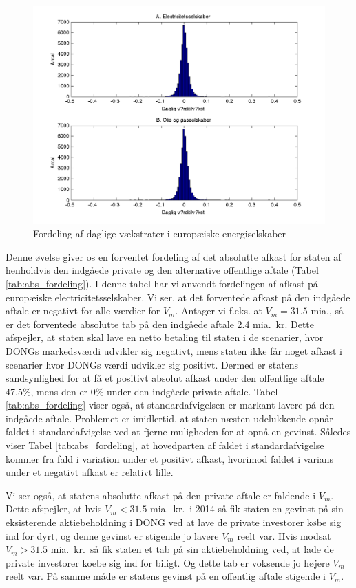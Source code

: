 \documentclass{article}
\begin{document}
\begin{figure}
\includegraphics[scale=0.8]{../matlab/figs/data_hist}
\caption{Fordeling af daglige v\ae{}kstrater i europ\ae{}iske energiselskaber}
\label{fig:data_hist}
\end{figure}

Denne øvelse giver os en forventet fordeling af det absolutte afkast for staten af henholdvis den indgåede private og den alternative offentlige aftale (Tabel \ref{tab:abs_fordeling}). I denne tabel har vi anvendt fordelingen af afkast på europæiske electricitetsselskaber. Vi ser, at det forventede afkast på den indgåede aftale er negativt for alle værdier for $V_m$. Antager vi f.eks. at $V_m=31.5$ mia., så er det forventede absolutte tab på den indgåede aftale 2.4 mia.\ kr. Dette afspejler, at staten skal lave en netto betaling til staten i de scenarier, hvor DONGs markedsværdi udvikler sig negativt, mens staten ikke får noget afkast i scenarier hvor DONGs værdi udvikler sig positivt. Dermed er statens sandsynlighed for at få et positivt absolut afkast under den offentlige aftale 47.5\%, mens den er 0\% under den indgåede private aftale. Tabel \ref{tab:abs_fordeling} viser også, at standardafvigelsen er markant lavere på den indgåede aftale. Problemet er imidlertid, at staten næsten udelukkende opnår faldet i standardafvigelse ved at fjerne muligheden for at opnå en gevinst. Således viser Tabel \ref{tab:abs_fordeling}, at hovedparten af faldet i standardafvigelse kommer fra fald i variation under et positivt afkast, hvorimod faldet i varians under et negativt afkast er relativt lille.

Vi ser også, at statens absolutte afkast på den private aftale er faldende i $V_m$. Dette afspejler, at hvis $V_m<31.5$ mia.\ kr.\ i 2014 så fik staten en gevinst på sin eksisterende aktiebeholdning i DONG ved at lave de private investorer købe sig ind for dyrt, og denne gevinst er stigende jo lavere $V_m$ reelt var. Hvis modsat $V_m>31.5$ mia.\ kr.\, så fik staten et tab på sin aktiebeholdning ved, at lade de private investorer koebe sig ind for biligt. Og dette tab er voksende jo højere $V_m$ reelt var. På samme måde er statens gevinst på en offentlig aftale stigende i $V_m$.
\end{document}
